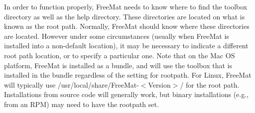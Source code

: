 In order to function properly, Free\-Mat needs to know where to find the {\ttfamily toolbox} directory as well as the {\ttfamily help} directory. These directories are located on what is known as the {\ttfamily root path}. Normally, Free\-Mat should know where these directories are located. However under some circumstances (usually when Free\-Mat is installed into a non-\/default location), it may be necessary to indicate a different root path location, or to specify a particular one. Note that on the Mac O\-S platform, Free\-Mat is installed as a bundle, and will use the toolbox that is installed in the bundle regardless of the setting for {\ttfamily rootpath}. For Linux, Free\-Mat will typically use {\ttfamily /usr/local/share/\-Free\-Mat-\/$<$Version$>$/} for the root path. Installations from source code will generally work, but binary installations (e.\-g., from an {\ttfamily R\-P\-M}) may need to have the rootpath set.

